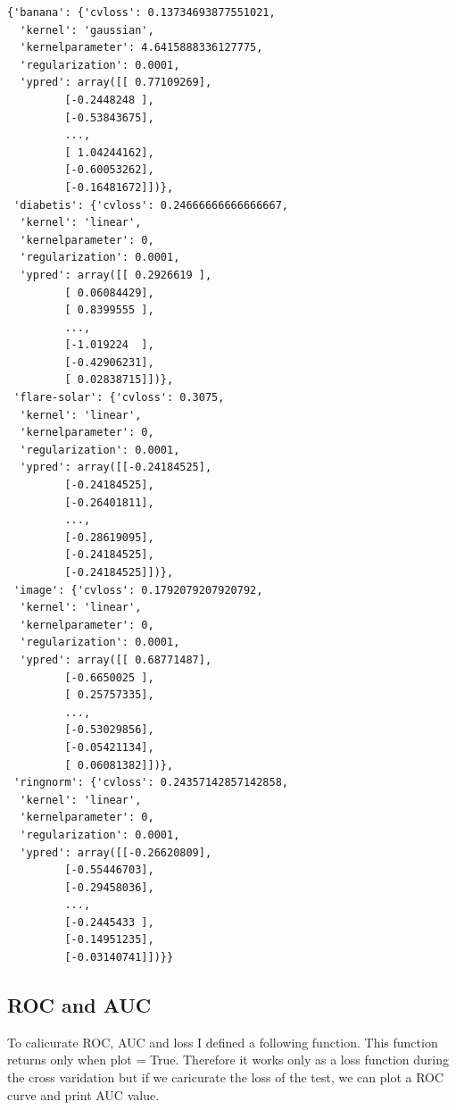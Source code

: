 \documentclass[a4paper,11pt]{article}
\begin{document}
\begin{verbatim}
{'banana': {'cvloss': 0.13734693877551021,
  'kernel': 'gaussian',
  'kernelparameter': 4.6415888336127775,
  'regularization': 0.0001,
  'ypred': array([[ 0.77109269],
         [-0.2448248 ],
         [-0.53843675],
         ..., 
         [ 1.04244162],
         [-0.60053262],
         [-0.16481672]])},
 'diabetis': {'cvloss': 0.24666666666666667,
  'kernel': 'linear',
  'kernelparameter': 0,
  'regularization': 0.0001,
  'ypred': array([[ 0.2926619 ],
         [ 0.06084429],
         [ 0.8399555 ],
         ..., 
         [-1.019224  ],
         [-0.42906231],
         [ 0.02838715]])},
 'flare-solar': {'cvloss': 0.3075,
  'kernel': 'linear',
  'kernelparameter': 0,
  'regularization': 0.0001,
  'ypred': array([[-0.24184525],
         [-0.24184525],
         [-0.26401811],
         ..., 
         [-0.28619095],
         [-0.24184525],
         [-0.24184525]])},
 'image': {'cvloss': 0.1792079207920792,
  'kernel': 'linear',
  'kernelparameter': 0,
  'regularization': 0.0001,
  'ypred': array([[ 0.68771487],
         [-0.6650025 ],
         [ 0.25757335],
         ..., 
         [-0.53029856],
         [-0.05421134],
         [ 0.06081382]])},
 'ringnorm': {'cvloss': 0.24357142857142858,
  'kernel': 'linear',
  'kernelparameter': 0,
  'regularization': 0.0001,
  'ypred': array([[-0.26620809],
         [-0.55446703],
         [-0.29458036],
         ..., 
         [-0.2445433 ],
         [-0.14951235],
         [-0.03140741]])}}
\end{verbatim}



\subsection*{ROC and AUC}

To calicurate ROC, AUC and loss I defined a following function. This function returns only when plot = True. Therefore it works only as a loss function during the cross varidation but if we caricurate the loss of the test, we can plot a ROC curve and print AUC value.
\end{document}
